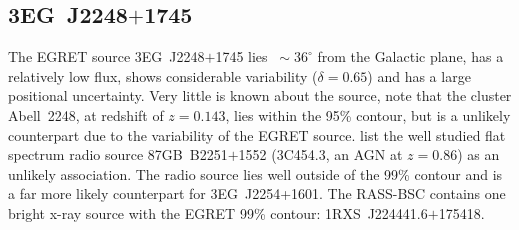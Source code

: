 \subsection{3EG~J2248$+$1745}

The EGRET \Gray source 3EG~J2248$+$1745 lies $~\sim36^\circ$ from the
Galactic plane, has a relatively low flux, shows considerable
variability ($\delta=0.65$) and has a large positional
uncertainty. Very little is known about the source,
\citet{REF::COLAFRANCESCO::AA2002} note that the cluster Abell~2248, at
redshift of $z=0.143$, lies within the 95\% contour, but is a unlikely
counterpart due to the variability of the EGRET source.
\citet{REF::MATTOX::APJS2001} list the well studied flat spectrum
radio source 87GB~B2251$+$1552 (3C454.3, an AGN at $z=0.86$) as an
unlikely association. The radio source lies well outside of the 99\%
contour and is a far more likely counterpart for 3EG~J2254+1601. The
RASS-BSC contains one bright x-ray source with the EGRET 99\% contour:
1RXS~J224441.6$+$175418.

